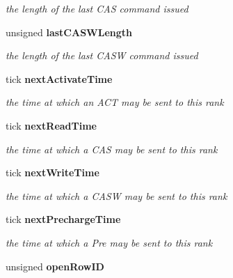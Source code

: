 \begin{CompactItemize}
\begin{CompactList}\small\item\em the length of the last CAS command issued \item\end{CompactList}\item 
unsigned {\bf lastCASWLength}\label{class_d_r_a_msim_i_i_1_1_bank_13671b3b1796ca5b2caa0962173917bd}

\begin{CompactList}\small\item\em the length of the last CASW command issued \item\end{CompactList}\item 
tick {\bf nextActivateTime}\label{class_d_r_a_msim_i_i_1_1_bank_6a48df6911a12cb377e96ce17ffb4812}

\begin{CompactList}\small\item\em the time at which an ACT may be sent to this rank \item\end{CompactList}\item 
tick {\bf nextReadTime}\label{class_d_r_a_msim_i_i_1_1_bank_1a3853a15aeb5acdebb08276cd3ab058}

\begin{CompactList}\small\item\em the time at which a CAS may be sent to this rank \item\end{CompactList}\item 
tick {\bf nextWriteTime}\label{class_d_r_a_msim_i_i_1_1_bank_a9457ae760afdb834c9b68ee769ade5f}

\begin{CompactList}\small\item\em the time at which a CASW may be sent to this rank \item\end{CompactList}\item 
tick {\bf nextPrechargeTime}\label{class_d_r_a_msim_i_i_1_1_bank_5ce499e4b27efbcc9eb49e135651c971}

\begin{CompactList}\small\item\em the time at which a Pre may be sent to this rank \item\end{CompactList}\item 
unsigned {\bf openRowID}\label{class_d_r_a_msim_i_i_1_1_bank_40240127116ab430e809ed300949511e}


\end{CompactItemize}

